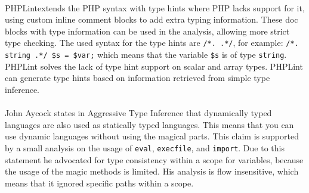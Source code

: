 \documentclass[../main.tex]{subfiles}
\begin{document}
    \paragraph{}
    PHPLint\footnotemark extends the PHP syntax with type hints where PHP lacks support for it, using custom inline comment blocks to add extra typing information.
    These doc blocks with type information can be used in the analysis, allowing more strict type checking.
    The used syntax for the type hints are \texttt{/*. .*/}, for example: \texttt{/*. string .*/ \$s = \$var;} which means that the variable \texttt{\$s} is of type \texttt{string}.
    PHPLint solves the lack of type hint support on scalar and array types.
    PHPLint can generate type hints based on information retrieved from simple type inference.
    
    \paragraph{}
    John Aycock states in Aggressive Type Inference\cite{Ayc:00} that dynamically typed languages are also used as statically typed languages.
    This means that you can use dynamic languages without using the magical parts.
    This claim is supported by a small analysis on the usage of \texttt{eval}, \texttt{execfile}, and \texttt{import}.
    Due to this statement he advocated for type consistency within a scope for variables, because the usage of the magic methods is limited.
    His analysis is flow insensitive, which means that it ignored specific paths within a scope.
\end{document}
